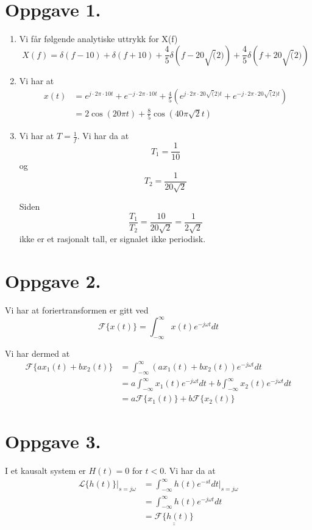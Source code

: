 \documentclass[a4paper,11pt,norsk]{article}
\begin{document}


\section*{Oppgave 1.}
\begin{enumerate}
    \item Vi får følgende analytiske uttrykk for X(f)
        \[
            X(f) = \delta(f - 10) + \delta(f + 10) + \frac{4}{5}\delta\left(f - 20\sqrt(2)\right) + \frac{4}{5}\delta\left(f + 20\sqrt(2)\right) 
        \]
    \item Vi har at
        \begin{align*}
            x(t) &= e^{j \cdot 2\pi \cdot 10 t} + e^{-j \cdot 2\pi \cdot 10 t} + \frac{4}{5}\left(e^{j \cdot 2\pi \cdot 20\sqrt(2) t} + e^{-j \cdot 2\pi \cdot 20\sqrt(2) t}\right) \\
                 &= 2 \cos\left(20 \pi t\right) + \frac{8}{5} \cos\left(40\pi \sqrt{2} t\right)
        \end{align*}

    \item Vi har at $T = \frac{1}{f}$. Vi har da at
        \[
            T_1 = \frac{1}{10}
        \]
        og 
        \[
            T_2 = \frac{1}{20\sqrt{2}}
        \]

        Siden 
        \[
            \frac{T_1}{T_2} = \frac{10}{20\sqrt{2}} = \frac{1}{2\sqrt{2}}
        \]
        ikke er et rasjonalt tall, er signalet ikke periodisk.
\end{enumerate}

\section*{Oppgave 2.}
Vi har at foriertransformen er gitt ved
\[
    \mathscr{F}\{x(t)\} = \int_{-\infty}^{\infty}{x(t) e^{-j\omega t} dt}
\]

Vi har dermed at 
\begin{align*}
    \mathscr{F}\{a x_1(t) + b x_2(t)\} &= \int_{-\infty}^{\infty}{(a x_1(t) + b x_2(t)) e^{-j \omega t} dt} \\
                                       &= a\int_{-\infty}^{\infty}{x_1(t) e^{-j \omega t} dt} + b \int_{-\infty}^{\infty}{x_2(t) e^{-j \omega t} dt} \\
                                       &= a \mathscr{F}\{x_1(t)\} + b \mathscr{F}\{x_2(t)\}
\end{align*}

\section*{Oppgave 3.}
I et kausalt system er $H(t) = 0$ for $t < 0$. Vi har da at
\begin{align*}
    \mathscr{L}\{h(t)\}\Big|_{s = j\omega} &= \int_{-\infty}^{\infty}{h(t) e^{-st} dt}\Big|_{s = j\omega} \\
                                           &= \int_{-\infty}^{\infty}{h(t) e^{-j\omega t} dt} \\
                                           &= \underline{\underline{\mathscr{F}\{h(t)\}}}
\end{align*}
\end{document}
